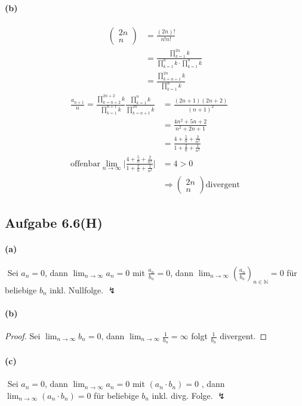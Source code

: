 \paragraph{(b)}
\begin{align*}
\begin{pmatrix}
2n \\
n
\end{pmatrix}
&=\frac{(2n)!}{n!n!}\\
&=\frac{\prod_{k=1}^{2n}k}{\prod_{k=1}^{n}k\cdot\prod_{k=1}^{n}k}\\
&=\frac{\prod_{k=n+1}^{2n}k}{\prod_{k=1}^{n}k}
\end{align*}
\begin{align*}
\frac{a_{n+1}}{n}=\frac{\prod_{k=n+2}^{2n+2}k}{\prod_{k=1}^{n+1}k}\frac{\prod_{k=1}^{n}k}{\prod_{k=n+1}^{2n}k}
&=\frac{(2n+1)(2n+2)}{(n+1)^2}\\
&=\frac{4n^2+5n+2}{n^2+2n+1}\\
&=\frac{4+\frac{5}{n}+\frac{2}{n^2}}{1+\frac{2}{n}+\frac{1}{n^2}}\\
\mbox{offenbar}\lim_{n\rightarrow\infty}\Bigg|\frac{4+\frac{5}{n}+\frac{2}{n^2}}{1+\frac{2}{n}+\frac{1}{n^2}}\Bigg|&=4>0\\
&\Rightarrow
\begin{pmatrix}
2n \\
n
\end{pmatrix}\mbox{divergent}
\end{align*}

\subsection{Aufgabe 6.6(H)}

\paragraph{(a)}
$ $\newline
Sei $a_n=0$, dann $\lim_{n\rightarrow\infty}a_n=0$ mit $\frac{a_n}{b_n}=0$, dann $\lim_{n\rightarrow\infty}(\frac{a_n}{b_n})_{n\in\mathbb{N}}=0$ für beliebige $b_n$ inkl. Nullfolge. $\lightning$

\paragraph{(b)}
\begin{proof}
Sei $\lim_{n\rightarrow\infty}b_n=0$, dann $\lim_{n\rightarrow\infty}\frac{1}{b_n}=\infty$ folgt $\frac{1}{b_n}$ divergent.
\end{proof}

\paragraph{(c)}
$ $\newline
Sei $a_n=0$, dann $\lim_{n\rightarrow\infty}a_n=0$ mit $(a_n\cdot b_n)=0$ , dann $\lim_{n\rightarrow\infty}(a_n\cdot b_n)=0$ für beliebige $b_n$ inkl. divg. Folge. $\lightning$
